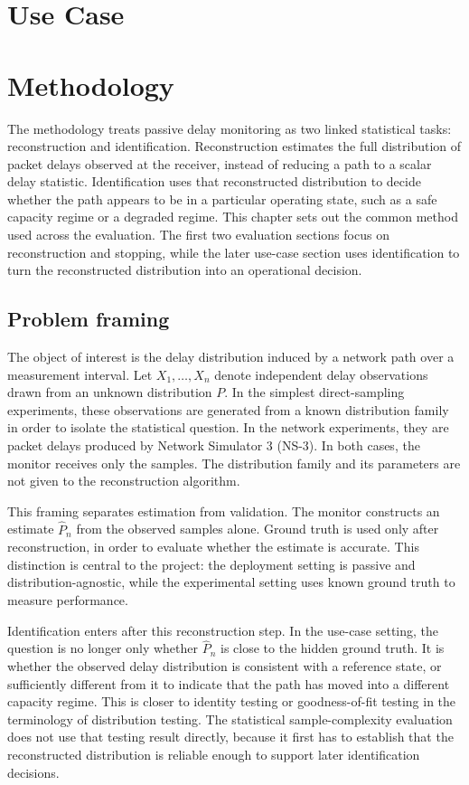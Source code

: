 \documentclass[a4paper,11pt]{report}
\begin{document}
\chapter{Use Case}

\chapter{Methodology}

The methodology treats passive delay monitoring as two linked statistical tasks: reconstruction and identification. Reconstruction estimates the full distribution of packet delays observed at the receiver, instead of reducing a path to a scalar delay statistic. Identification uses that reconstructed distribution to decide whether the path appears to be in a particular operating state, such as a safe capacity regime or a degraded regime. This chapter sets out the common method used across the evaluation. The first two evaluation sections focus on reconstruction and stopping, while the later use-case section uses identification to turn the reconstructed distribution into an operational decision.

\section{Problem framing}
\label{sec:method-problem-framing}

The object of interest is the delay distribution induced by a network path over a measurement interval. Let \(X_1,\ldots,X_n\) denote independent delay observations drawn from an unknown distribution \(P\). In the simplest direct-sampling experiments, these observations are generated from a known distribution family in order to isolate the statistical question. In the network experiments, they are packet delays produced by Network Simulator 3 (NS-3). In both cases, the monitor receives only the samples. The distribution family and its parameters are not given to the reconstruction algorithm.

This framing separates estimation from validation. The monitor constructs an estimate \(\widehat{P}_n\) from the observed samples alone. Ground truth is used only after reconstruction, in order to evaluate whether the estimate is accurate. This distinction is central to the project: the deployment setting is passive and distribution-agnostic, while the experimental setting uses known ground truth to measure performance.

Identification enters after this reconstruction step. In the use-case setting, the question is no longer only whether \(\widehat{P}_n\) is close to the hidden ground truth. It is whether the observed delay distribution is consistent with a reference state, or sufficiently different from it to indicate that the path has moved into a different capacity regime. This is closer to identity testing or goodness-of-fit testing in the terminology of distribution testing. The statistical sample-complexity evaluation does not use that testing result directly, because it first has to establish that the reconstructed distribution is reliable enough to support later identification decisions.
\end{document}

